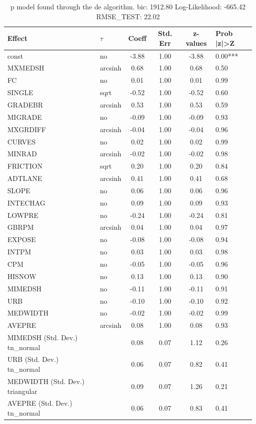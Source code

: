 \begin{table}
	\caption{p model found through the de algorithm. bic: 1912.80 Log-Likelihood: -665.42 RMSE_TEST: 22.02}
	\begin{center}
		\begin{tabular}{|l|l|c|c|c|l|}
			\hline
			Effect & $\tau$ & Coeff & Std. Err & z-values & Prob |z|>Z \\
			\hline
			const & no & -3.88 & 1.00 & -3.88 & 0.00*** \\
			\hline
			MXMEDSH & arcsinh & 0.68 & 1.00 & 0.68 & 0.50 \\
			\hline
			FC & no & 0.01 & 1.00 & 0.01 & 0.99 \\
			\hline
			SINGLE & sqrt & -0.52 & 1.00 & -0.52 & 0.60 \\
			\hline
			GRADEBR & arcsinh & 0.53 & 1.00 & 0.53 & 0.59 \\
			\hline
			MIGRADE & no & -0.09 & 1.00 & -0.09 & 0.93 \\
			\hline
			MXGRDIFF & arcsinh & -0.04 & 1.00 & -0.04 & 0.96 \\
			\hline
			CURVES & no & 0.02 & 1.00 & 0.02 & 0.99 \\
			\hline
			MINRAD & arcsinh & -0.02 & 1.00 & -0.02 & 0.98 \\
			\hline
			FRICTION & sqrt & 0.20 & 1.00 & 0.20 & 0.84 \\
			\hline
			ADTLANE & arcsinh & 0.41 & 1.00 & 0.41 & 0.68 \\
			\hline
			SLOPE & no & 0.06 & 1.00 & 0.06 & 0.96 \\
			\hline
			INTECHAG & no & 0.09 & 1.00 & 0.09 & 0.93 \\
			\hline
			LOWPRE & no & -0.24 & 1.00 & -0.24 & 0.81 \\
			\hline
			GBRPM & arcsinh & 0.04 & 1.00 & 0.04 & 0.97 \\
			\hline
			EXPOSE & no & -0.08 & 1.00 & -0.08 & 0.94 \\
			\hline
			INTPM & no & 0.03 & 1.00 & 0.03 & 0.98 \\
			\hline
			CPM & no & -0.05 & 1.00 & -0.05 & 0.96 \\
			\hline
			HISNOW & no & 0.13 & 1.00 & 0.13 & 0.90 \\
			\hline
			MIMEDSH & no & -0.11 & 1.00 & -0.11 & 0.91 \\
			\hline
			URB & no & -0.10 & 1.00 & -0.10 & 0.92 \\
			\hline
			MEDWIDTH & no & -0.02 & 1.00 & -0.02 & 0.99 \\
			\hline
			AVEPRE & arcsinh & 0.08 & 1.00 & 0.08 & 0.93 \\
			\hline
			MIMEDSH (Std. Dev.) tn_normal &  & 0.08 & 0.07 & 1.12 & 0.26 \\
			\hline
			URB (Std. Dev.) tn_normal &  & 0.06 & 0.07 & 0.82 & 0.41 \\
			\hline
			MEDWIDTH (Std. Dev.) triangular &  & 0.09 & 0.07 & 1.26 & 0.21 \\
			\hline
			AVEPRE (Std. Dev.) tn_normal &  & 0.06 & 0.07 & 0.83 & 0.41 \\
			\hline
		\end{tabular}
	\end{center}
\end{table}
